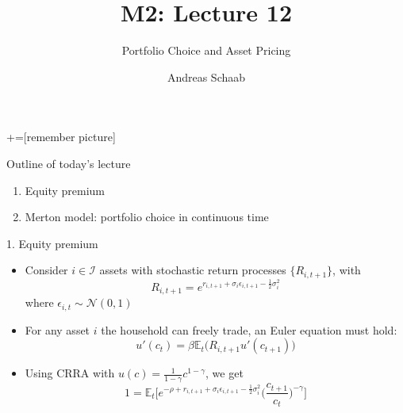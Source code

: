 \documentclass[10pt]{beamer}
\title{\large M2: Lecture 12}
\subtitle{Portfolio Choice and Asset Pricing}
\author{Andreas Schaab}
\date{}
\begin{document}
+=[remember picture]
\thispagestyle{empty}
\maketitle 
\newpage

\addtocounter{framenumber}{-1}




\begin{frame}{Outline of today's lecture}
\addtocounter{framenumber}{-1}

\begin{enumerate}
\item Equity premium

\item Merton model: portfolio choice in continuous time
\end{enumerate}
\end{frame}



\begin{frame}{1. Equity premium}
\begin{itemize}
\item Consider $i \in \mathcal I$ assets with stochastic return processes $\{ R_{i, t+1} \}$, with 
\begin{equation*}
	R_{i, t+1} = e^{ r_{i, t+1} + \sigma_i \epsilon_{i, t+1} - \frac{1}{2} \sigma_i^2}
\end{equation*}
where $\epsilon_{i, t} \sim \mathcal N(0, 1)$

\item For any asset $i$ the household can freely trade, an Euler equation must hold: 
\begin{equation*}
	u'(c_t) = \beta \mathbb{E}_t \Big( R_{i, t+1} u'(c_{t+1}) \Big)
\end{equation*}

\item Using CRRA with $u(c) = \frac{1}{1-\gamma} c^{1-\gamma}$, we get
\begin{equation*}
	1 = \mathbb E_t \bigg[ e^{- \rho + r_{i, t+1} + \sigma_i \epsilon_{i, t+1} - \frac{1}{2} \sigma_i^2} \bigg( \frac{ c_{t+1}}{c_t} \bigg) ^{-\gamma} \bigg]
\end{equation*}
\end{itemize}
\end{frame}
\end{document}
